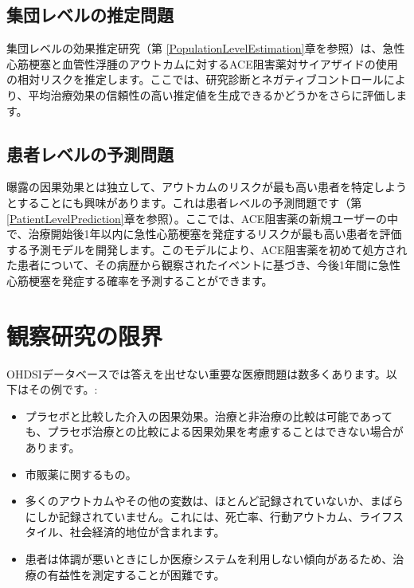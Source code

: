 \documentclass[
  11pt]{book}
\providecommand{\tightlist}{%
  \setlength{\itemsep}{0pt}\setlength{\parskip}{0pt}}
\theoremstyle{definition}
\theoremstyle{definition}
\theoremstyle{definition}
\theoremstyle{definition}
\theoremstyle{remark}
\begin{document}
\subsection{集団レベルの推定問題}\label{ux96c6ux56e3ux30ecux30d9ux30ebux306eux63a8ux5b9aux554fux984c}

集団レベルの効果推定研究（第 \ref{PopulationLevelEstimation}章を参照）は、急性心筋梗塞と血管性浮腫のアウトカムに対するACE阻害薬対サイアザイドの使用の相対リスクを推定します。ここでは、研究診断とネガティブコントロールにより、平均治療効果の信頼性の高い推定値を生成できるかどうかをさらに評価します。

\subsection{患者レベルの予測問題}\label{ux60a3ux8005ux30ecux30d9ux30ebux306eux4e88ux6e2cux554fux984c}

曝露の因果効果とは独立して、アウトカムのリスクが最も高い患者を特定しようとすることにも興味があります。これは患者レベルの予測問題です（第 \ref{PatientLevelPrediction}章を参照）。ここでは、ACE阻害薬の新規ユーザーの中で、治療開始後1年以内に急性心筋梗塞を発症するリスクが最も高い患者を評価する予測モデルを開発します。このモデルにより、ACE阻害薬を初めて処方された患者について、その病歴から観察されたイベントに基づき、今後1年間に急性心筋梗塞を発症する確率を予測することができます。

\section{観察研究の限界}\label{ux89b3ux5bdfux7814ux7a76ux306eux9650ux754c}


OHDSIデータベースでは答えを出せない重要な医療問題は数多くあります。以下はその例です。:

\begin{itemize}
\tightlist
\item
  プラセボと比較した介入の因果効果。治療と非治療の比較は可能であっても、プラセボ治療との比較による因果効果を考慮することはできない場合があります。
\item
  市販薬に関するもの。
\item
  多くのアウトカムやその他の変数は、ほとんど記録されていないか、まばらにしか記録されていません。これには、死亡率、行動アウトカム、ライフスタイル、社会経済的地位が含まれます。
\item
  患者は体調が悪いときにしか医療システムを利用しない傾向があるため、治療の有益性を測定することが困難です。
\end{itemize}
\end{document}
